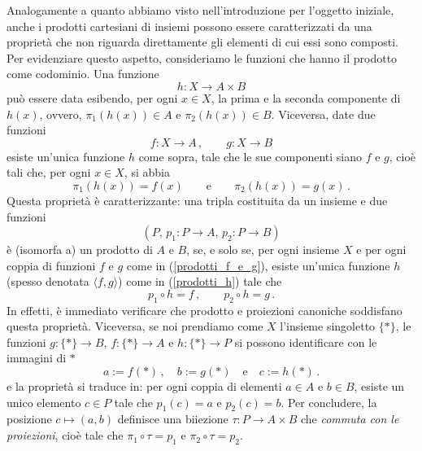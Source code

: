 Analogamente a quanto abbiamo visto nell'introduzione per l'oggetto iniziale, anche i prodotti cartesiani di insiemi possono essere caratterizzati da una proprietà che non riguarda direttamente gli elementi di cui essi sono composti. Per evidenziare questo aspetto, consideriamo le funzioni che hanno il prodotto come codominio. Una funzione 
\begin{equation}\label{prodotti_h}
h\colon X\to A\times B
\end{equation}
può essere data esibendo, per ogni \(x\in X\), la prima e la seconda componente di \(h(x)\), ovvero, \(\pi_1(h(x))\in A\) e \(\pi_2(h(x))\in B\). Viceversa, date due funzioni 
\begin{equation}\label{prodotti_f_e_g}
f\colon X\to A\,,\qquad g\colon X\to B	
\end{equation}
esiste un'unica funzione \(h\) come sopra, tale che le sue componenti siano \(f\) e \(g\), cioè tali che, per ogni \(x\in X\), si abbia
\[
\pi_1(h(x))=f(x)\qquad\text{e}\qquad \pi_2(h(x))=g(x)\,.
\]
Questa proprietà è caratterizzante: una tripla costituita da un insieme e due funzioni
\[
(P,\,  p_1\colon P\to A,\,  p_2\colon P\to B) 
\]
è (isomorfa a) un prodotto di \(A\) e \(B\), se, e solo se, per ogni insieme \(X\) e per ogni coppia di funzioni \(f\) e \(g\) come in (\ref{prodotti_f_e_g}), esiste un'unica funzione \(h\) (spesso denotata \(\langle f,g\rangle\)) come in (\ref{prodotti_h}) tale che 
\[
p_1\circ h = f\,,\qquad p_2\circ h=g\,.
\]
In effetti, è immediato verificare che prodotto e proiezioni canoniche soddisfano questa proprietà. Viceversa, se noi prendiamo come \(X\) l'insieme singoletto \(\{*\}\),  le funzioni \(g\colon \{*\}\to B\), \(f\colon \{*\}\to A\)  e \(h\colon \{*\}\to P\) si possono identificare con le immagini di $*$
\[
a:= f(*)\,,\quad  b:= g(*) \quad \text{e}\quad c:= h(*)\,.
\]
e la proprietà si traduce in: per ogni coppia di elementi \(a\in A\) e \(b\in B\), esiste un unico elemento \(c\in P\) tale che \(p_1(c)=a\) e \(p_2(c)=b\). Per concludere, la posizione \(c\mapsto (a,b)\) definisce una biiezione \(\tau \colon P\to A\times B\) che \emph{commuta con le proiezioni}, cioè tale che \(\pi_1\circ \tau =p_1\) e \(\pi_2\circ \tau =p_2\). 

